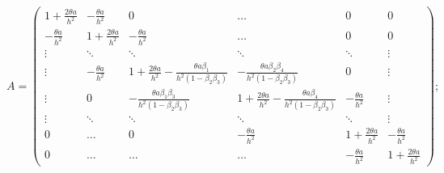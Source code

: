 $$ A = \begin{pmatrix}
1 + \frac{2\theta a}{h^2} & 
-\frac{\theta a}{h^2} & 
0 & 
\dots 
&
0&
0\\

-\frac{\theta a}{h^2} & 
1 + \frac{2\theta a}{h^2} & 
-\frac{\theta a}{h^2} & 
\dots
&
0&
0 \\

\vdots & \ddots & \ddots & \ddots & \ddots & \vdots \\

\vdots & 
-\frac{\theta a}{h^2} & 
1 + \frac{2\theta a}{h^2}-\frac{\theta a \beta_1}{h^2(1-\beta_2 \beta_3)} & 
- \frac{\theta a\beta_2 \beta_4}{h^2(1-\beta_2 \beta_3)} & 
0 &
\vdots \\

\vdots & 
0 &
-\frac{\theta a\beta_1 \beta_3}{h^2(1-\beta_2 \beta_3)} & 
1 + \frac{2\theta a}{h^2}-\frac{\theta a \beta_4}{h^2(1-\beta_2 \beta_3)} & 
-\frac{\theta a}{h^2} & 
\vdots \\

\vdots & \ddots & \ddots & \ddots & \ddots & \vdots \\

0 &
\dots & 
0 &
-\frac{\theta a}{h^2} &
1 + \frac{2\theta a}{h^2} & 
-\frac{\theta a}{h^2}\\

0 &
\dots &
\dots &
\dots & 
-\frac{\theta a}{h^2} & 
1 + \frac{2\theta a}{h^2}
\end{pmatrix};
$$

